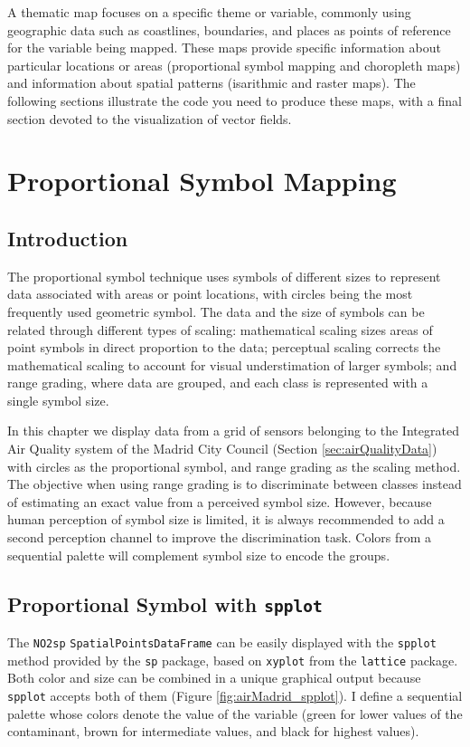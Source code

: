 \documentclass[smallroyalvopaper]{memoir}
\begin{document}
A thematic map focuses on a specific theme or variable, commonly using geographic data such as coastlines, boundaries, and places as points of reference for the variable being mapped. These maps provide specific information about particular locations or areas (proportional symbol mapping and choropleth maps) and information about spatial patterns (isarithmic and raster maps). The following sections illustrate the code you need to produce these maps, with a final section devoted to the visualization of vector fields.
\section{Proportional Symbol Mapping}
\label{sec-1}
\label{sec:bubble}
\subsection{Introduction}
\label{sec-1-1}
The proportional symbol technique uses symbols of different sizes
to represent data associated with areas or point locations, with
circles being the most frequently used geometric symbol. The data
and the size of symbols can be related through different types of
scaling: mathematical scaling sizes areas of point symbols in
direct proportion to the data; perceptual scaling corrects the
mathematical scaling to account for visual understimation of
larger symbols; and range grading, where data are grouped, and each
class is represented with a single symbol size. 

In this chapter we display data from a grid of sensors belonging to
the Integrated Air Quality system of the Madrid City Council (Section
\ref{sec:airQualityData}) with circles as the proportional symbol, and
range grading as the scaling method. The objective when using range
grading is to discriminate between classes instead of estimating an
exact value from a perceived symbol size. However, because human
perception of symbol size is limited, it is always recommended to
add a second perception channel to improve the discrimination
task. Colors from a sequential palette will complement symbol size to
encode the groups.

\subsection{Proportional Symbol with \texttt{spplot}}
\label{sec-1-2}
The \texttt{NO2sp} \texttt{SpatialPointsDataFrame} can be easily displayed
with the \texttt{spplot} method provided by the \texttt{sp} package, based on
\texttt{xyplot} from the \texttt{lattice} package. Both color and size can be
combined in a unique graphical output because \texttt{spplot} accepts
both of them (Figure \ref{fig:airMadrid_spplot}). I define a
sequential palette whose colors denote the value of the variable
(green for lower values of the contaminant, brown for intermediate
values, and black for highest values).
\end{document}
